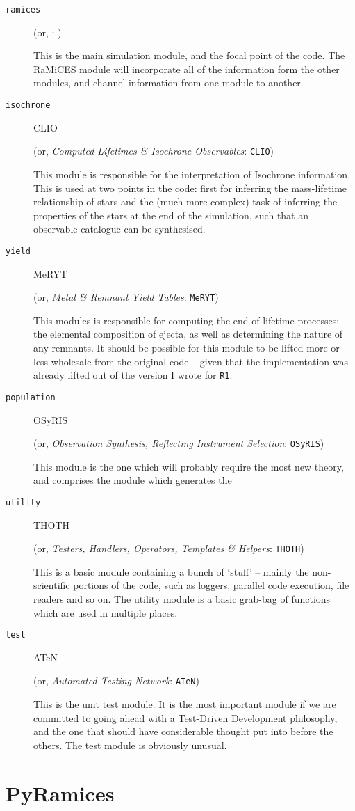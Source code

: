 \documentclass[a4paper,10pt]{article}
\begin{document}
			\newcommand\module[4]
			{
				\item[\texttt{#1}]					
				\def\temp{#3}
				\ifx\temp\empty
				
				\else
				(or, {\it #4}: \texttt{#3})
				\fi


				#2
			}
			\begin{description}	
			\module{ramices}
			{
				This is the main simulation module, and the focal point of the code. The RaMiCES module will incorporate all of the information form the other modules, and channel information from one module to another. 
			}{}{}
			\module{isochrone}
			{
				This module is responsible for the interpretation of Isochrone information. This is used at two points in the code: first for inferring the mass-lifetime relationship of stars and the (much more complex) task of inferring the properties of the stars at the end of the simulation, such that an observable catalogue can be synthesised.
				}{CLIO}{Computed Lifetimes \& Isochrone Observables}
			
			\module{yield}
			{
				This modules is responsible for computing the end-of-lifetime processes: the elemental composition of ejecta, as well as determining the nature of any remnants. It should be possible for this module to be lifted more or less wholesale from the original code -- given that the \RTwo{} implementation was already lifted out of the version I wrote for \texttt{R1}.
			}{MeRYT}{Metal \& Remnant Yield Tables}

			\module{population}
			{
				This module is the one which will probably require the most new theory, and comprises the module which generates the 
			}{OSyRIS}{Observation Synthesis, Reflecting Instrument Selection}

			\module{utility}
			{
				This is a basic module containing a bunch of `stuff' -- mainly the non-scientific portions of the code, such as loggers, parallel code execution, file readers and so on. The utility module is a basic grab-bag of functions which are used in multiple places. 
			}{THOTH}{Testers, Handlers, Operators, Templates \& Helpers}

			\module{test}
			{
				This is the unit test module. It is the most important module if we are committed to going ahead with a Test-Driven Development philosophy, and the one that should have considerable thought put into before the others. The test module is obviously unusual.
			}{ATeN}{Automated Testing Network}
			\end{description}
	\newpage
		\section{PyRamices}
\end{document}

